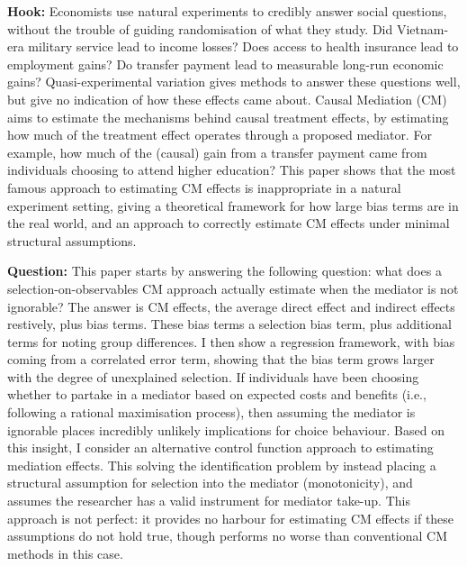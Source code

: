 \textbf{Hook:}
Economists use natural experiments to credibly answer social questions, without the trouble of guiding randomisation of what they study.
Did Vietnam-era military service lead to income losses?
Does access to health insurance lead to employment gains?
Do transfer payment  lead to measurable long-run economic gains?
Quasi-experimental variation gives methods to answer these questions well, but give no indication of how these effects came about.
Causal Mediation (CM) aims to estimate the mechanisms behind causal treatment effects, by estimating how much of the treatment effect operates through a proposed mediator.
For example, how much of the (causal) gain from a transfer payment came from individuals choosing to attend higher education?
This paper shows that the most famous approach to estimating CM effects is inappropriate in a natural experiment setting, giving a theoretical framework for how large bias terms are in the real world, and an approach to correctly estimate CM effects under minimal structural assumptions.


\textbf{Question:}
This paper starts by answering the following question: what does a selection-on-observables CM approach actually estimate when the mediator is not ignorable?
The answer is CM effects, the average direct effect and indirect effects restively, plus bias terms.
These bias terms a selection bias term, plus additional terms for noting group differences.
I then show a regression framework, with bias coming from a correlated error term, showing that the bias term grows larger with the degree of unexplained selection.
If individuals have been choosing whether to partake in a mediator based on expected costs and benefits (i.e., following a rational maximisation process), then assuming the mediator is ignorable places incredibly unlikely implications for choice behaviour.
Based on this insight, I consider an alternative control function approach to estimating mediation effects.
This solving the identification problem by instead placing a structural assumption for selection into the mediator (monotonicity), and assumes the researcher has a valid instrument for mediator take-up.
This approach is not perfect: it provides no harbour for estimating CM effects if these assumptions do not hold true, though performs no worse than conventional CM methods in this case.

